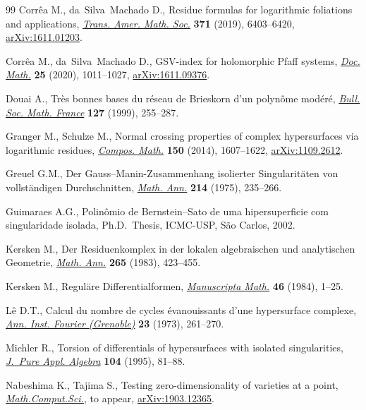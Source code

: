 \documentclass[10pt,a4paper]{amsart}
\numberwithin{equation}{section}
\begin{document}
\begin{thebibliography}{99}
Corr\^ea M., da~Silva~Machado D., Residue formulas for logarithmic foliations
 and applications, \href{https://doi.org/10.1090/tran/7584}{\textit{Trans. Amer. Math. Soc.}} \textbf{371} (2019),
 6403--6420, \href{https://arxiv.org/abs/1611.01203}{arXiv:1611.01203}.

Corr\^ea M., da~Silva~Machado D., G{SV}-index for holomorphic {P}faff systems,
 \href{https://doi.org/10.25537/dm.2020v25.1011-1027}{\textit{Doc. Math.}} \textbf{25} (2020), 1011--1027, \href{https://arxiv.org/abs/1611.09376}{arXiv:1611.09376}.

Douai A., Tr\`es bonnes bases du r\'eseau de {B}rieskorn d'un polyn\^ome
 mod\'er\'e, \href{https://doi.org/10.24033/bsmf.2348}{\textit{Bull. Soc. Math. France}} \textbf{127} (1999), 255--287.

Granger M., Schulze M., Normal crossing properties of complex hypersurfaces via
 logarithmic residues, \href{https://doi.org/10.1112/S0010437X13007860}{\textit{Compos. Math.}} \textbf{150} (2014), 1607--1622,
 \href{https://arxiv.org/abs/1109.2612}{arXiv:1109.2612}.

Greuel G.M., Der {G}auss--{M}anin-{Z}usammenhang isolierter {S}ingularit\"aten
 von vollst\"andigen {D}urchschnitten, \href{https://doi.org/10.1007/BF01352108}{\textit{Math. Ann.}} \textbf{214}
 (1975), 235--266.

Guimaraes A.G., Polin\^omio de {B}ernstein--{S}ato de uma hipersuperficie com
 singularidade isolada, Ph.D.~Thesis, {I}CMC-{U}SP, S\~ao Carlos, 2002.

Kersken M., Der {R}esiduenkomplex in der lokalen algebraischen und analytischen
 {G}eometrie, \href{https://doi.org/10.1007/BF01455946}{\textit{Math. Ann.}} \textbf{265} (1983), 423--455.

Kersken M., Regul\"are {D}ifferentialformen, \href{https://doi.org/10.1007/BF01185193}{\textit{Manuscripta Math.}}
 \textbf{46} (1984), 1--25.

L\^e D.T., Calcul du nombre de cycles \'evanouissants d'une hypersurface
 complexe, \href{https://doi.org/10.5802/aif.491}{\textit{Ann. Inst. Fourier (Grenoble)}} \textbf{23} (1973),
 261--270.

Michler R., Torsion of differentials of hypersurfaces with isolated
 singularities, \href{https://doi.org/10.1016/0022-4049(94)00117-2}{\textit{J.~Pure Appl. Algebra}} \textbf{104} (1995), 81--88.

Nabeshima K., Tajima S., Testing zero-dimensionality of varieties at a point,
 \href{https://doi.org/10.1007/s11786-020-00484-y}{\textit{Math.Comput.Sci.}}, {t}o appear, \href{https://arxiv.org/abs/1903.12365}{arXiv:1903.12365}.


\end{thebibliography}
\end{document}
